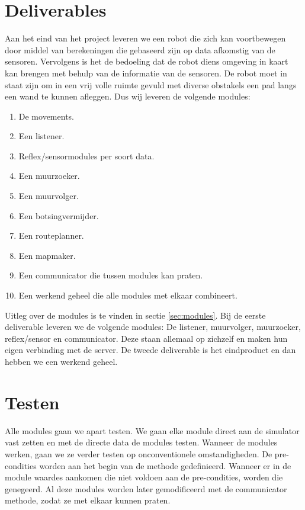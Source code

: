 \documentclass[a4paper,10pt]{article}
\begin{document}
\section{Deliverables}
Aan het eind van het project leveren we een robot die zich kan voortbewegen door middel van berekeningen die gebaseerd zijn op data afkomstig van de sensoren. Vervolgens is het de bedoeling dat de robot diens omgeving in kaart kan brengen met behulp van de informatie van de sensoren. De robot moet in staat zijn om in een vrij volle ruimte gevuld met diverse obstakels een pad langs een wand te kunnen afleggen.
Dus wij leveren de volgende modules:
\begin{enumerate}
\item De movements.
\item Een listener.
\item Reflex/sensormodules per soort data.
\item Een muurzoeker.
\item Een muurvolger.
\item Een botsingvermijder.
\item Een routeplanner.
\item Een mapmaker.
\item Een communicator die tussen modules kan praten.
\item Een werkend geheel die alle modules met elkaar combineert.
\end{enumerate}
Uitleg over de modules is te vinden in sectie \ref{sec:modules}.
Bij de eerste deliverable leveren we de volgende modules: De listener, muurvolger, muurzoeker, reflex/sensor en communicator. Deze staan allemaal op zichzelf en maken hun eigen verbinding met de server. De tweede deliverable is het eindproduct en dan hebben we een werkend geheel.
\section{Testen}
Alle modules gaan we apart testen. We gaan elke module direct aan de simulator vast zetten en met de directe data de modules testen. Wanneer de modules werken, gaan we ze verder testen op onconventionele omstandigheden. De pre-condities worden aan het begin van de methode gedefinieerd. Wanneer er in de module waardes aankomen die niet voldoen aan de pre-condities, worden die genegeerd. Al deze modules worden later gemodificeerd met de communicator methode, zodat ze met elkaar kunnen praten.
\end{document}
